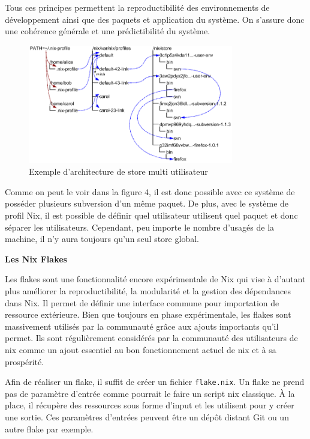 \documentclass[a4paper,french,12pt, titlepage]{article}
\begin{document}
Tous ces principes permettent la reproductibilité des environnements de
développement ainsi que des paquets et application du système. On
s'assure donc une cohérence générale et une prédictibilité du
système.\newline

\begin{figure}[h]
\centering
\includegraphics[width=0.8\textwidth,height=0.8\textheight,keepaspectratio]{images/store.png}
\caption{Exemple d'architecture de store multi utilisateur}
\end{figure}

Comme on peut le voir dans la figure 4, il est donc possible avec ce
système de posséder plusieurs subversion d'un même paquet. De plus, avec
le système de profil Nix, il est possible de définir quel utilisateur
utilisent quel paquet et donc séparer les utilisateurs. Cependant, peu
importe le nombre d'usagés de la machine, il n'y aura toujours qu'un
seul store global.\newline

\textbf{Les Nix Flakes}\newline

Les flakes sont une fonctionnalité encore expérimentale de Nix qui vise
à d'autant plus améliorer la reproductibilité, la modularité et la
gestion des dépendances dans Nix. Il permet de définir une interface
commune pour importation de ressource extérieure. Bien que toujours en
phase expérimentale, les flakes sont massivement utilisés par la
communauté grâce aux ajouts importants qu'il permet. Ils sont
régulièrement considérés par la communauté des utilisateurs de nix comme
un ajout essentiel au bon fonctionnement actuel de nix et à sa
prospérité.\newline

Afin de réaliser un flake, il suffit de créer un fichier
\texttt{flake.nix}. Un flake ne prend pas de paramètre d'entrée comme
pourrait le faire un script nix classique. À la place, il récupère des
ressources sous forme d'input et les utilisent pour y créer une sortie.
Ces paramètres d'entrées peuvent être un dépôt distant Git ou un autre
flake par exemple.\newline
\end{document}
